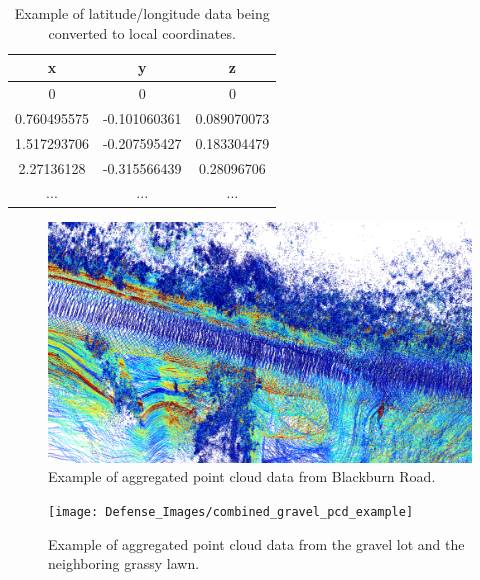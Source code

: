 \documentclass[numbered,pdftex]{ohio-etd}
\begin{document}
{{		\begin{table}[]
			\centering
			\begin{tabular}{|c|c|c|}
				\hline
				x           & y            & z           \\ \hline
				0           & 0            & 0           \\ \hline
				0.760495575 & -0.101060361 & 0.089070073 \\ \hline
				1.517293706 & -0.207595427 & 0.183304479 \\ \hline
				2.27136128  & -0.315566439 & 0.28096706  \\ \hline
				...         & ...          & ...         \\ \hline
			\end{tabular}
			\caption[Example Lat/Lon to Local Data]{Example of latitude/longitude data being converted to local coordinates.}
			\label{tab:local_coord_example}
		\end{table}
		
		\begin{figure}[H]
			\centering
			\includegraphics[width=0.95\linewidth]{Defense_Images/combined_pcd_example}
			\caption[Example Aggregated Point Cloud]{Example of aggregated point cloud data from Blackburn Road.}
			\label{fig:combined_pcd_example}
		\end{figure}
		
		\begin{figure}[H]
			\centering
			\texttt{[image: Defense\_Images/combined\_gravel\_pcd\_example]}
			\caption[Example Aggregated Point Cloud]{Example of aggregated point cloud data from the gravel lot and the neighboring grassy lawn.}
			\label{fig:combined_gravel_pcd_example}
		\end{figure}	
			
	} %
	
}
\end{document}
